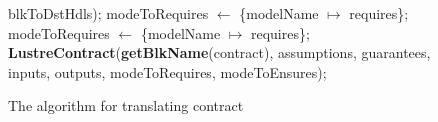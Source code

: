 \documentclass{article}
\begin{document}
\begin{figure}
\begin{algorithmic}
\State {\ \ \ \ \ \ \ \ \ \ \ \ \ \ \ \ \ \ \ \ \ \ \ \ \ \ \ \ \ \ \ \ \ \ \ \ \ \ \ \ \ \ \ \ \ \ \ \ \ \ \ \ \ \ \ \ \ \ \ \ \ \ \ \ \ \ \ \ \ \ \ \ \ \ \ \ \ \ \ \ \ \ \ \ \ \ \ \ } blkToDstHdls);
\State {\ \ \ \ \ \ \ \ \ \ \ \ \ \ \ \ \ \ \ \ \ \ } modeToRequires $\leftarrow$ \{modelName $\mapsto$ requires\};
\State {\ \ \ \ \ \ \ \ \ \ \ \ \ \ \ \ \ \ \ \ \ \ } modeToRequires $\leftarrow$ \{modelName $\mapsto$ requires\};
\State \textbf{LustreContract}(\textbf{getBlkName}(contract), assumptions, guarantees, inputs, outputs, 
\State {\ \ \ \ \ \ \ \ \ \ \ \ \ \ \ \ \ \ \ \ \ \ \ \ } modeToRequires, modeToEnsures);
\EndFunction
\end{algorithmic}
\label{translatecontract}
\caption{The algorithm for translating contract }
\end{figure}
\end{document}
